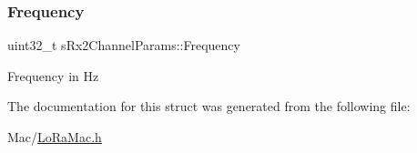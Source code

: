 \subsubsection{\texorpdfstring{Frequency}{Frequency}}
{\footnotesize\ttfamily uint32\+\_\+t s\+Rx2\+Channel\+Params\+::\+Frequency}

Frequency in Hz 

The documentation for this struct was generated from the following file\+:\begin{DoxyCompactItemize}
\item 
Mac/\hyperlink{LoRaMac_8h}{Lo\+Ra\+Mac.\+h}\end{DoxyCompactItemize}

